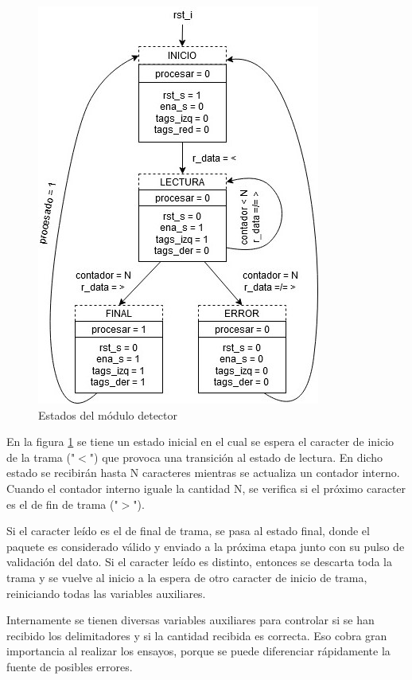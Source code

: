 		\begin{figure}[h]
		\centering
			\includegraphics[scale=.65]{./Figures/Estados-Detector}
			\caption{Estados del módulo detector}
			\label{fig:Estados_Detector}
		\end{figure}
		
		
		En la figura \ref{fig:Estados_Detector} se tiene un estado inicial en el cual se espera el caracter de inicio de la trama ("$<$") que provoca una transición al estado de lectura. En dicho estado se recibirán hasta N caracteres mientras se actualiza un contador interno. Cuando el contador interno iguale la cantidad N, se verifica si el próximo caracter es el de fin de trama ("$>$").
		
		Si el caracter leído es el de final de trama, se pasa al estado final, donde el paquete es considerado válido y enviado a la próxima etapa junto con su pulso de validación del dato. Si el caracter leído es distinto, entonces se descarta toda la trama y se vuelve al inicio a la espera de otro caracter de inicio de trama, reiniciando todas las variables auxiliares.
		
		Internamente se tienen diversas variables auxiliares para controlar si se han recibido los delimitadores y si la cantidad recibida es correcta. Eso cobra gran importancia al realizar los ensayos, porque se puede diferenciar rápidamente la fuente de posibles errores.
		
